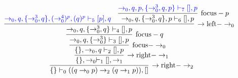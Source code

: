 \documentclass[landscape]{article}
\begin{document}
$$
\infer[\to\mbox{right}-\to_{2}]
{{{\{\} \vdash_{0} ((q \to_{0}p) \to_{2}(q \to_{1}p)),[]}}}
{
\infer[\to\mbox{right}-\to_{1}]
{{{\{\}, \to_{0} \vdash_{1} [], \to_{1}}}}
{
\infer[\mbox{focus}-\to_{0}]
{{{\{\}, \to_{0},q \vdash_{2} [],p}}}
{
\infer[\mbox{focus}-q]
{{{ \to_{0},q,\{ \to_{0}^{3}\} \vdash_{3} [],p}}}
{
\infer[\to\mbox{left}-\to_{0}]
{{{ \to_{0},q,\{ \to_{0}^{3},q\} \vdash_{4} [],p}}}
{
{\color{blue}{{{ \to_{0},q,\{ \to_{0}^{3},q\},( \to_{0}^{4})^{p},(q)^{p} \vdash_{5} [p],q}}}} & \infer[\mbox{focus}-p]
{{{ \to_{0},q,\{ \to_{0}^{3},q\},p \vdash_{6} [],p}}}
{
{\color{blue}{{{ \to_{0},q,p,\{ \to_{0}^{3},q,p\} \vdash_{7} [],p}}}}
}
}
}
}
}
}
$$
\end{document}
